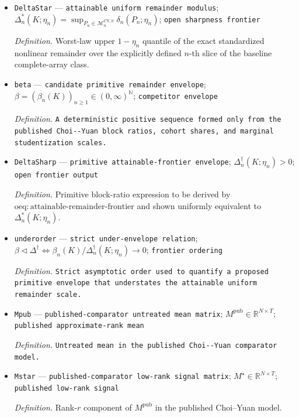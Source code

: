 \documentclass{article}
\begin{document}
\begin{itemize}
  \item \texttt{DeltaStar} --- \texttt{attainable uniform remainder modulus}; \(\Delta_n^*(K;\eta_n)=\sup_{P_n\in\mathcal M_n^{\mathrm{CY},0}}\delta_n(P_n;\eta_n)\); \texttt{open sharpness frontier}
  \par\smallskip\noindent\emph{Definition.} Worst-law upper \(1-\eta_n\) quantile of the exact standardized nonlinear remainder over the explicitly defined \(n\)-th slice of the baseline complete-array class.
  \item \texttt{beta} --- \texttt{candidate primitive remainder envelope}; \(\beta=(\beta_n(K))_{n\ge1}\in(0,\infty)^{\mathbb N}\); \texttt{competitor envelope}
  \par\smallskip\noindent\emph{Definition.} \texttt{A deterministic positive sequence formed only from the published Choi-\allowbreak{}-\allowbreak{}Yuan block ratios,\allowbreak{} cohort shares,\allowbreak{} and marginal studentization scales.}
  \item \texttt{DeltaSharp} --- \texttt{primitive attainable-\allowbreak{}frontier envelope}; \(\Delta_n^{\dagger}(K;\eta_n)>0\); \texttt{open frontier output}
  \par\smallskip\noindent\emph{Definition.} Primitive block-ratio expression to be derived by \(\mathrm{oeq:attainable\mbox{-}remainder\mbox{-}frontier}\) and shown uniformly equivalent to \(\Delta_n^*(K;\eta_n)\).
  \item \texttt{underorder} --- \texttt{strict under-\allowbreak{}envelope relation}; \(\beta\triangleleft\Delta^{\dagger}\iff\beta_n(K)/\Delta_n^{\dagger}(K;\eta_n)\to0\); \texttt{frontier ordering}
  \par\smallskip\noindent\emph{Definition.} \texttt{Strict asymptotic order used to quantify a proposed primitive envelope that understates the attainable uniform remainder scale.}
  \item \texttt{Mpub} --- \texttt{published-\allowbreak{}comparator untreated mean matrix}; \(M^{\mathrm{pub}}\in\mathbb R^{N\times T}\); \texttt{published approximate-\allowbreak{}rank mean}
  \par\smallskip\noindent\emph{Definition.} \texttt{Untreated mean in the published Choi-\allowbreak{}-\allowbreak{}Yuan comparator model.}
  \item \texttt{Mstar} --- \texttt{published-\allowbreak{}comparator low-\allowbreak{}rank signal matrix}; \(M^\star\in\mathbb R^{N\times T}\); \texttt{published low-\allowbreak{}rank signal}
  \par\smallskip\noindent\emph{Definition.} Rank-\(r\) component of \(M^{\mathrm{pub}}\) in the published Choi--Yuan model.

\end{itemize}
\end{document}
